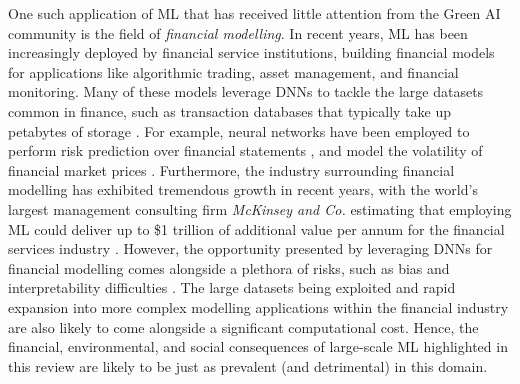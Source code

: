 \documentclass[a4paper, 12pt]{article}
\begin{document}
    One such application of ML that has received little attention from the Green AI community is the field of \emph{financial modelling}. In recent years, ML has been increasingly deployed by financial service institutions, building financial models for applications like algorithmic trading, asset management, and financial monitoring. Many of these models leverage DNNs to tackle the large datasets common in finance, such as transaction databases that typically take up petabytes of storage \cite{oecd-2021}. For example, neural networks have been employed to perform risk prediction over financial statements \cite{green-choi-1997}, and model the volatility of financial market prices \cite{cao-2019}. Furthermore, the industry surrounding financial modelling has exhibited tremendous growth in recent years, with the world's largest management consulting firm \emph{McKinsey and Co.} estimating that employing ML could deliver up to \$1 trillion of additional value per annum for the financial services industry \cite{kumar-2022}. However, the opportunity presented by leveraging DNNs for financial modelling comes alongside a plethora of risks, such as bias and interpretability difficulties \cite{laplante-2019}. The large datasets being exploited and rapid expansion into more complex modelling applications within the financial industry are also likely to come alongside a significant computational cost. Hence, the financial, environmental, and social consequences of large-scale ML highlighted in this review are likely to be just as prevalent (and detrimental) in this domain. 
\end{document}
